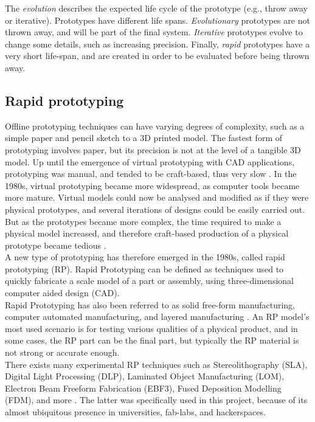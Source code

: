 The \emph{evolution} describes the expected life cycle of the prototype (e.g., throw away or iterative). Prototypes have different life spans. \emph{Evolutionary} prototypes are not thrown away, and will be part of the final system. \emph{Iterative} prototypes evolve to change some details, such as increasing precision. Finally, \emph{rapid} prototypes have a very short life-span, and are created in order to be evaluated before being thrown away.

\subsection{Rapid prototyping}

Offline prototyping techniques can have varying degrees of complexity, such as a simple paper and pencil sketch to a 3D printed model. The fastest form of prototyping involves paper, but its precision is not at the level of a tangible 3D model. Up until the emergence of virtual prototyping with CAD applications, prototyping was manual, and tended to be craft-based, thus very slow \cite{chua2010}. In the 1980s, virtual prototyping became more widespread, as computer tools became more mature. Virtual models could now be analysed and modified as if they were physical prototypes, and several iterations of designs could be easily carried out. But as the prototypes became more complex, the time required to make a physical model increased, and therefore craft-based production of a physical prototype became tedious \cite{chua2010}. \\

A new type of prototyping has therefore emerged in the 1980s, called rapid prototyping (RP). Rapid Prototyping can be defined as techniques used to quickly fabricate a scale model of a part or assembly, using three-dimensional computer aided design (CAD). \\

Rapid Prototyping has also been referred to as solid free-form manufacturing, computer automated manufacturing, and layered manufacturing \cite{efunda}. An RP model's most used scenario is for testing various qualities of a physical product, and in some cases, the RP part can be the final part, but typically the RP material is not strong or accurate enough. \\

There exists many experimental RP techniques such as Stereolithography (SLA), Digital Light Processing (DLP), Laminated Object Manufacturing (LOM), Electron Beam Freeform Fabrication (EBF3), Fused Deposition Modelling (FDM), and more \cite{wiki3D}. The latter was specifically used in this project, because of its almost ubiquitous presence in universities, fab-labs, and hackerspaces. \\

